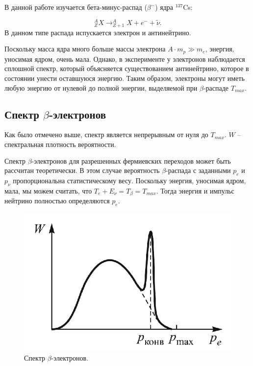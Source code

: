 \documentclass[a4paper, 12pt]{article} %
\begin{document}
	В данной работе изучается бета-минус-распад ($\beta^{-}$) ядра $^{137}$Cs:
	
	\begin{equation}
		^A_Z X \rightarrow ^{A}_{Z+1} X + e^{-} + \tilde{\nu}.
	\end{equation}
	В данном типе распада испускается электрон и антинейтрино.
	
	Поскольку масса ядра много больше массы электрона $A \cdot m_{p} \gg m_{e}$, энергия, уносимая ядром, очень мала. Однако, в эксперименте у электронов наблюдается сплошной спектр, который объясняется существованием антинейтрино, которое в состоянии унести оставшуюся энергию. Таким образом, электроны могут иметь любую энергию от нулевой до полной энергии, выделяемой при $\beta$-распаде $T_{max}$.
	
\subsection{Спектр $\beta$-электронов}
	
	Как было отмечено выше, спектр является непрерывным от нуля до $T_{max}$. $W$ -- спектральная плотность вероятности.
	
	Спектр $\beta$-электронов для разрешенных фермиевских переходов может быть рассчитан теоретически. В этом случае вероятность $\beta$-распада с заданными $p_e$ и $p_{\nu}$ пропорциональна статистическому весу. Поскольку энергия, уносимая ядром, мала, мы можем считать, что $T_e + E_{\nu} = T_{\beta} = T_{max}$. Тогда энергия и импульс нейтрино полностью определяются $p_e$.
	
	\begin{figure}
		\includegraphics[scale=0.6]{res/spectrum.png}
		\caption{Спектр $\beta$-электронов.}
		\label{fig:spectrum}
		\vspace{0pt}
	\end{figure}
	
\end{document}

